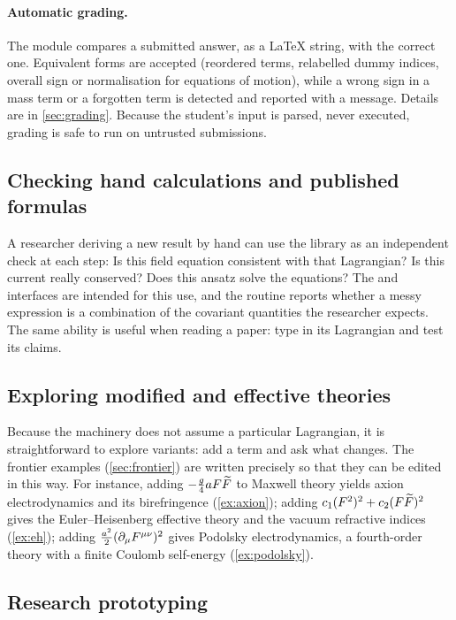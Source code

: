 \paragraph{Automatic grading.} The  module compares a submitted answer, as a \LaTeX{} string, with the correct one. Equivalent forms are accepted (reordered terms, relabelled dummy indices, overall sign or normalisation for equations of motion), while a wrong sign in a mass term or a forgotten term is detected and reported with a message. Details are in \cref{sec:grading}. Because the student's input is parsed, never executed, grading is safe to run on untrusted submissions.

\subsection{Checking hand calculations and published formulas}

A researcher deriving a new result by hand can use the library as an independent check at each step: Is this field equation consistent with that Lagrangian? Is this current really conserved? Does this ansatz solve the equations? The  and  interfaces are intended for this use, and the  routine reports whether a messy expression is a combination of the covariant quantities the researcher expects. The same ability is useful when reading a paper: type in its Lagrangian and test its claims.

\subsection{Exploring modified and effective theories}

Because the machinery does not assume a particular Lagrangian, it is straightforward to explore variants: add a term and ask what changes. The frontier examples (\cref{sec:frontier}) are written precisely so that they can be edited in this way. For instance, adding $-\tfrac g4aF\widetilde{F}$ to Maxwell theory yields axion electrodynamics and its birefringence (\cref{ex:axion}); adding $c_1(F^2)^2+c_2(F\widetilde{F})^2$ gives the Euler--Heisenberg effective theory and the vacuum refractive indices (\cref{ex:eh}); adding $\tfrac{a^2}{2}(\partial_\mu F^{\mu\nu})^2$ gives Podolsky electrodynamics, a fourth-order theory with a finite Coulomb self-energy (\cref{ex:podolsky}).

\subsection{Research prototyping}

